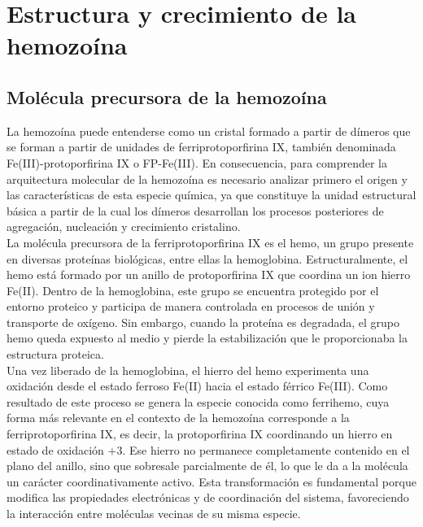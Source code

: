 \documentclass[12pt,letterpaper,oneside]{report}
\begin{document}
\chapter{Estructura y crecimiento de la hemozoína}



\section{Molécula precursora de la hemozoína}

La hemozoína puede entenderse como un cristal formado a partir de dímeros que se forman a partir de unidades de ferriprotoporfirina IX, también denominada Fe(III)-protoporfirina IX o FP-Fe(III). En consecuencia, para comprender la arquitectura molecular de la hemozoína es necesario analizar primero el origen y las características de esta especie química, ya que constituye la unidad estructural básica a partir de la cual los dímeros desarrollan los procesos posteriores de agregación, nucleación y crecimiento cristalino.\\

La molécula precursora de la ferriprotoporfirina IX es el hemo, un grupo presente en diversas proteínas biológicas, entre ellas la hemoglobina. Estructuralmente, el hemo está formado por un anillo de protoporfirina IX que coordina un ion hierro Fe(II). Dentro de la hemoglobina, este grupo se encuentra protegido por el entorno proteico y participa de manera controlada en procesos de unión y transporte de oxígeno. Sin embargo, cuando la proteína es degradada, el grupo hemo queda expuesto al medio y pierde la estabilización que le proporcionaba la estructura proteica.\\

Una vez liberado de la hemoglobina, el hierro del hemo experimenta una oxidación desde el estado ferroso Fe(II) hacia el estado férrico Fe(III). Como resultado de este proceso se genera la especie conocida como ferrihemo, cuya forma más relevante en el contexto de la hemozoína corresponde a la ferriprotoporfirina IX, es decir, la protoporfirina IX coordinando un hierro en estado de oxidación $+3$. Ese hierro no permanece completamente contenido en el plano del anillo, sino que sobresale parcialmente de él, lo que le da a la molécula un carácter coordinativamente activo. Esta transformación es fundamental porque modifica las propiedades electrónicas y de coordinación del sistema, favoreciendo la interacción entre moléculas vecinas de su misma especie.\\
\end{document}
